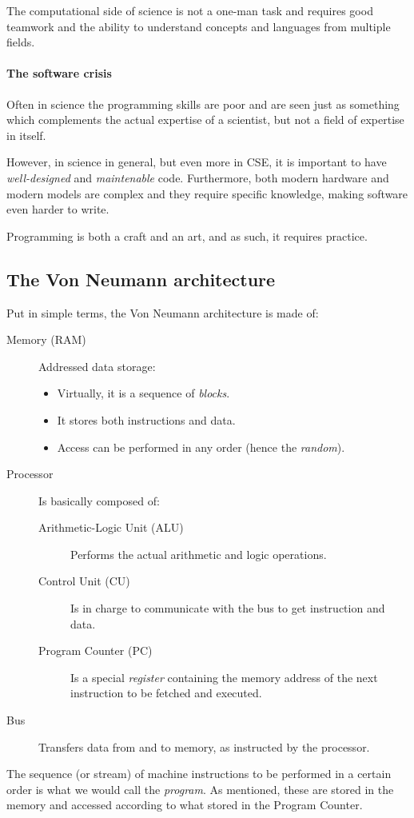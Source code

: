 The computational side of science is not a one-man task and requires good teamwork and the ability to understand concepts and languages from multiple fields.

\paragraph{The software crisis}
Often in science the programming skills are poor and are seen just as something which complements the actual expertise of a scientist, but not a field of expertise in itself.

However, in science in general, but even more in CSE, it is important to have \emph{well-designed} and \emph{maintenable} code.
Furthermore, both modern hardware and modern models are complex and they require specific knowledge, making software even harder to write.

Programming is both a craft and an art, and as such, it requires practice.

\subsection{The Von Neumann architecture}
Put in simple terms, the Von Neumann architecture is made of:
\begin{description}
	\item[Memory (RAM)] Addressed data storage:
		\begin{itemize}
			\item Virtually, it is a sequence of \emph{blocks}.
			\item It stores both instructions and data.
			\item Access can be performed in any order (hence the \emph{random}).
		\end{itemize}
	\item[Processor] Is basically composed of:
	\begin{description}
		\item[Arithmetic-Logic Unit (ALU)] Performs the actual arithmetic and logic operations.
		\item[Control Unit (CU)] Is in charge to communicate with the bus to get instruction and data.
		\item[Program Counter (PC)] Is a special \emph{register} containing the memory address of the next instruction to be fetched and executed.
	\end{description}
	\item[Bus] Transfers data from and to memory, as instructed by the processor.
\end{description}
The sequence (or stream) of machine instructions to be performed in a certain order is what we would call the \emph{program}. As mentioned, these are stored in the memory and accessed according to what stored in the Program Counter.
